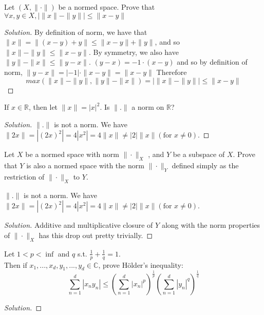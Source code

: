 \documentclass[10pt]{article}
\newenvironment{problem}[2][Problem]{\begin{trivlist}
		\item[\hskip \labelsep {\bfseries #1}\hskip \labelsep {\bfseries #2.}]}{\end{trivlist}}
\begin{document}
	\begin{problem}{1.5}
		Let $(X,\|\cdot\|)$ be a normed space. Prove that $\forall x,y \in X,|\|x\|-\|y\||\leq\|x-y\|$
	\end{problem}
	
	\begin{proof}[Solution]
		By definition of norm, we have that $\|x\|=\|(x-y)+y\|\leq\|x-y\|+\|y\|$, and so $\|x\|-\|y\|\leq\|x-y\|$.
		By symmetry, we also have $\|y\|-\|x\|\leq\|y-x\|$.
		$(y-x) = -1\cdot(x-y)$ and so by definition of norm, $\|y-x\|=|-1|\cdot\|x-y\|=\|x-y\|$ Therefore
		\[max(\|x\|-\|y\|,\|y\|-\|x\|)=|\|x\|-\|y\||\leq\|x-y\|\]
	\end{proof}

	\begin{problem}{1.6}
		If $x\in\mathbb{R}$, then let $\|x\|=|x|^2$. Is $\|.\|$ a norm on $\mathbb{R}$?
	\end{problem}
	
	\begin{proof}[Solution]
		$\|.\|$ is not a norm. We have $\|2x\|=|(2x)^2|=4|x^2|=4\|x\|\neq |2|\|x\| (\text{for } x\neq 0)$.
	\end{proof}

	\begin{problem}{1.7}
		Let $X$ be a normed space with norm $\|\cdot\|_X$ , and $Y$ be a subspace
	of $X$. Prove that $Y$ is also a normed space with the norm $\|\cdot\|_Y$ deﬁned simply
as the restriction of $\|\cdot\|_X$ to $Y$.
	\end{problem}
			$\|.\|$ is not a norm. We have $\|2x\|=|(2x)^2|=4|x^2|=4\|x\|\neq |2|\|x\| (\text{for } x\neq 0)$.
	\begin{proof}[Solution]
		Additive and multiplicative closure of $Y$ along with the norm properties of $\|\cdot\|_X$ has this drop out pretty trivially.
	\end{proof}	

	\begin{problem}{1.8}
		Let $1<p<\inf$ and $q$ s.t. $\frac{1}{p}+\frac{1}{q}=1$.\\
		Then if $x_1,...,x_d,y_1,...,y_d\in\mathbb{C}$, prove H\"older's inequality:
		\[\sum_{n=1}^{d}|x_ny_n|\leq\left(\sum_{n=1}^{d}|x_n|^p\right)^\frac{1}{p}\left(\sum_{n=1}^{d}|y_n|^q\right)^\frac{1}{q}\]
	\end{problem}
	
	\begin{proof}[Solution]
		
	\end{proof}
	
\end{document}
